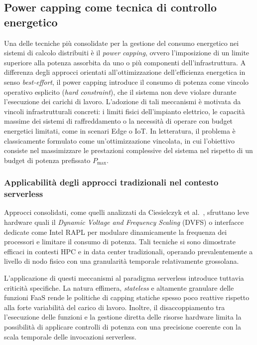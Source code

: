 \subsection{Power capping come tecnica di controllo energetico}
\label{subsec:power_capping}

Una delle tecniche più consolidate per la gestione del consumo energetico
nei sistemi di calcolo distribuiti è il \emph{power capping}, ovvero
l'imposizione di un limite superiore alla potenza assorbita da uno o
più componenti dell'infrastruttura. A differenza degli approcci orientati
all'ottimizzazione dell'efficienza energetica in senso \emph{best-effort},
il power capping introduce il consumo di potenza come vincolo operativo
esplicito (\emph{hard constraint}), che il sistema non deve violare
durante l'esecuzione dei carichi di lavoro. L'adozione di tali meccanismi
è motivata da vincoli infrastrutturali concreti: i limiti fisici
dell'impianto elettrico, le capacità massime dei sistemi di raffreddamento
o la necessità di operare con budget energetici limitati, come in scenari
Edge o IoT. In letteratura, il problema è classicamente formulato come
un'ottimizzazione vincolata, in cui l'obiettivo consiste nel massimizzare
le prestazioni complessive del sistema nel rispetto di un budget di
potenza prefissato $P_{\max}$.

\subsubsection{Applicabilità degli approcci tradizionali nel contesto serverless}

Approcci consolidati, come quelli analizzati da Ciesielczyk et
al.~\cite{Ciesielczyk2021}, sfruttano leve hardware quali il
\emph{Dynamic Voltage and Frequency Scaling} (DVFS) o interfacce dedicate
come Intel RAPL per modulare dinamicamente la frequenza dei processori e
limitare il consumo di potenza. Tali tecniche si sono dimostrate efficaci
in contesti HPC e in data center tradizionali, operando prevalentemente a
livello di nodo fisico con una granularità temporale relativamente
grossolana.

L'applicazione di questi meccanismi al paradigma serverless introduce
tuttavia criticità specifiche. La natura effimera, \emph{stateless} e
altamente granulare delle funzioni FaaS rende le politiche di capping
statiche spesso poco reattive rispetto alla forte variabilità del carico
di lavoro. Inoltre, il disaccoppiamento tra l'esecuzione delle funzioni e
la gestione diretta delle risorse hardware limita la possibilità di
applicare controlli di potenza con una precisione coerente con la scala
temporale delle invocazioni serverless.


